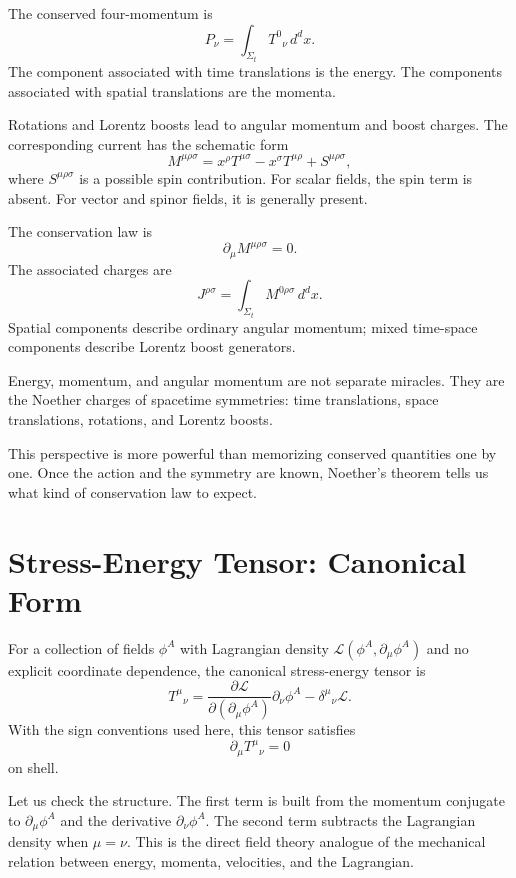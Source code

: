 The conserved four-momentum is
\[
    P_\nu=\int_{\Sigma_t}T^0{}_{\nu}\,d^d x.
\]
The component associated with time translations is the energy. The components
associated with spatial translations are the momenta.

Rotations and Lorentz boosts lead to angular momentum and boost charges. The
corresponding current has the schematic form
\[
    M^{\mu\rho\sigma}
    =x^\rho T^{\mu\sigma}-x^\sigma T^{\mu\rho}+S^{\mu\rho\sigma},
\]
where \(S^{\mu\rho\sigma}\) is a possible spin contribution. For scalar fields,
the spin term is absent. For vector and spinor fields, it is generally present.

The conservation law is
\[
    \partial_\mu M^{\mu\rho\sigma}=0.
\]
The associated charges are
\[
    J^{\rho\sigma}=\int_{\Sigma_t}M^{0\rho\sigma}\,d^d x.
\]
Spatial components describe ordinary angular momentum; mixed time-space
components describe Lorentz boost generators.

\begin{remarkbox}
Energy, momentum, and angular momentum are not separate miracles. They are the
Noether charges of spacetime symmetries: time translations, space translations,
rotations, and Lorentz boosts.
\end{remarkbox}

This perspective is more powerful than memorizing conserved quantities one by
one. Once the action and the symmetry are known, Noether's theorem tells us what
kind of conservation law to expect.

\section{Stress-Energy Tensor: Canonical Form}

For a collection of fields \(\phi^A\) with Lagrangian density
\(\mathcal{L}(\phi^A,\partial_\mu\phi^A)\) and no explicit coordinate dependence,
the canonical stress-energy tensor is
\[
    T^\mu{}_{\nu}
    =\frac{\partial\mathcal{L}}{\partial(\partial_\mu\phi^A)}
      \partial_\nu\phi^A
    -\delta^\mu{}_{\nu}\mathcal{L}.
\]
With the sign conventions used here, this tensor satisfies
\[
    \partial_\mu T^\mu{}_{\nu}=0
\]
on shell.

Let us check the structure. The first term is built from the momentum conjugate
to \(\partial_\mu\phi^A\) and the derivative \(\partial_\nu\phi^A\). The second
term subtracts the Lagrangian density when \(\mu=\nu\). This is the direct field
theory analogue of the mechanical relation between energy, momenta, velocities,
and the Lagrangian.

